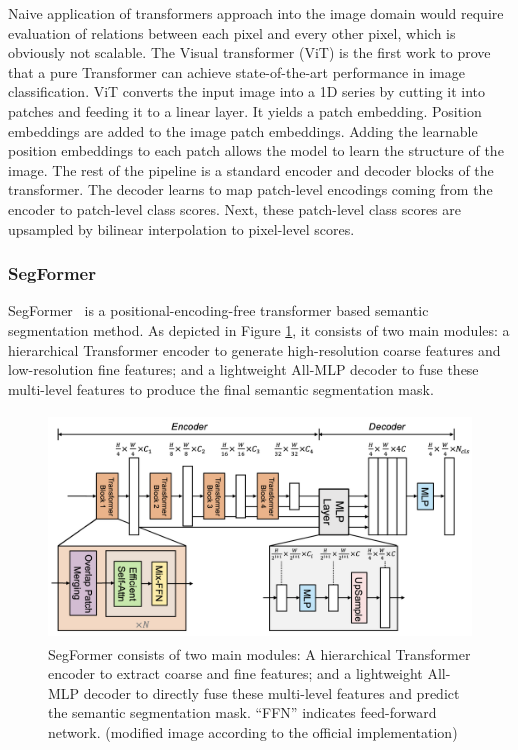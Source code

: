 Naive application of transformers approach into the image domain would require evaluation of relations between each pixel and every other pixel, which is obviously not scalable. The Visual transformer (ViT) \cite{dosovitskiy2020image} is the first work to prove that a pure Transformer can achieve state-of-the-art performance in image classification. ViT converts the input image into a 1D series by cutting it into patches and feeding it to a linear layer. It yields a patch embedding. Position embeddings are added to the image patch embeddings. Adding the learnable position embeddings to each patch allows the model to learn the structure of the image. The rest of the pipeline is a standard encoder and decoder blocks of the transformer.  The decoder learns to map patch-level encodings coming from the encoder to patch-level class scores. Next, these patch-level class scores are upsampled by bilinear interpolation to pixel-level scores.

\subsubsection{SegFormer}
SegFormer~\cite{xie2021segformer} is a positional-encoding-free transformer based semantic segmentation method. As depicted in Figure \ref{fig:segformer_over}, it consists of two main modules: a hierarchical Transformer encoder to generate high-resolution coarse features and low-resolution fine features; and a lightweight All-MLP decoder to fuse these multi-level features to produce the final semantic segmentation mask. 

\begin{figure}[h] %
    \centering
    \includegraphics[height=60mm]{figures/03_segformer_overview.png} %
    \caption{SegFormer consists of two main modules: A hierarchical Transformer encoder to extract coarse and fine features; and a lightweight All-MLP decoder to directly fuse these multi-level features and predict the semantic segmentation mask. “FFN” indicates feed-forward network. (modified image \cite{xie2021segformer} according to the official implementation)} %
    \label{fig:segformer_over} %
\end{figure} 

